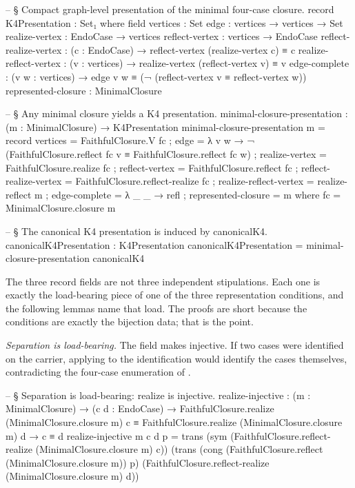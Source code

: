 \documentclass[11pt]{article}
\begin{document}
\begin{code}
-- § Compact graph-level presentation of the minimal four-case closure.
record K4Presentation : Set₁ where
  field
    vertices              : Set
    edge                  : vertices → vertices → Set
    realize-vertex        : EndoCase → vertices
    reflect-vertex        : vertices → EndoCase
    reflect-realize-vertex : (c : EndoCase) → reflect-vertex (realize-vertex c) ≡ c
    realize-reflect-vertex : (v : vertices) → realize-vertex (reflect-vertex v) ≡ v
    edge-complete         : (v w : vertices) → edge v w ≡ (¬ (reflect-vertex v ≡ reflect-vertex w))
    represented-closure   : MinimalClosure

  -- § Any minimal closure yields a K4 presentation.
minimal-closure-presentation : (m : MinimalClosure) → K4Presentation
minimal-closure-presentation m = record
  { vertices               = FaithfulClosure.V fc
  ; edge                   = λ v w → ¬ (FaithfulClosure.reflect fc v ≡ FaithfulClosure.reflect fc w)
  ; realize-vertex         = FaithfulClosure.realize fc
  ; reflect-vertex         = FaithfulClosure.reflect fc
  ; reflect-realize-vertex = FaithfulClosure.reflect-realize fc
  ; realize-reflect-vertex = realize-reflect m
  ; edge-complete          = λ _ _ → refl
  ; represented-closure    = m
  }
  where
    fc = MinimalClosure.closure m

-- § The canonical K4 presentation is induced by canonicalK4.
canonicalK4Presentation : K4Presentation
canonicalK4Presentation = minimal-closure-presentation canonicalK4
\end{code}

The three record fields are not three independent stipulations.  Each
one is exactly the load-bearing piece of one of the three
representation conditions, and the following lemmas name that load.
The proofs are short because the conditions are exactly the bijection
data; that is the point.

\emph{Separation is load-bearing.}  The field
 makes  injective.
If two cases were identified on the carrier, applying
 to the identification would identify the cases
themselves, contradicting the four-case enumeration of
.

\begin{code}
-- § Separation is load-bearing: realize is injective.
realize-injective :
  (m : MinimalClosure) →
  (c d : EndoCase) →
  FaithfulClosure.realize (MinimalClosure.closure m) c
    ≡ FaithfulClosure.realize (MinimalClosure.closure m) d →
  c ≡ d
realize-injective m c d p =
  trans (sym (FaithfulClosure.reflect-realize (MinimalClosure.closure m) c))
    (trans (cong (FaithfulClosure.reflect (MinimalClosure.closure m)) p)
      (FaithfulClosure.reflect-realize (MinimalClosure.closure m) d))
\end{code}
\end{document}
